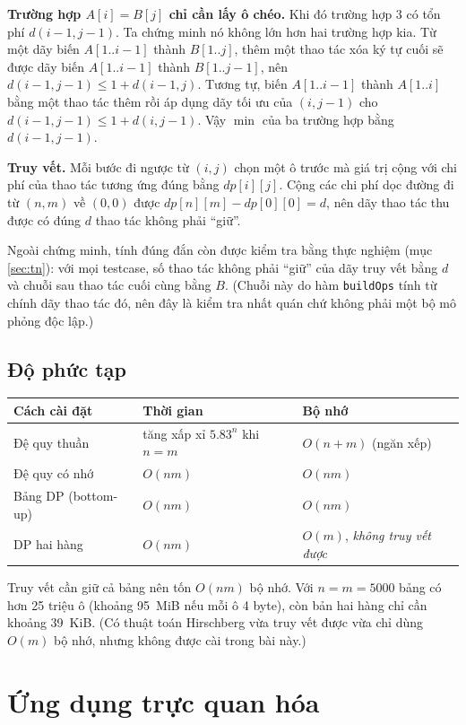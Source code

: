 \documentclass[12pt,a4paper]{article}
\newcommand{\code}[1]{\texttt{#1}}
\begin{document}
\textbf{Trường hợp $A[i]=B[j]$ chỉ cần lấy ô chéo.} Khi đó trường hợp 3 có tổn phí $d(i-1,j-1)$. Ta chứng minh nó không lớn hơn hai trường hợp kia. Từ một dãy biến $A[1..i-1]$ thành $B[1..j]$, thêm một thao tác xóa ký tự cuối sẽ được dãy biến $A[1..i-1]$ thành $B[1..j-1]$, nên $d(i-1,j-1)\le 1+d(i-1,j)$. Tương tự, biến $A[1..i-1]$ thành $A[1..i]$ bằng một thao tác thêm rồi áp dụng dãy tối ưu của $(i,j-1)$ cho $d(i-1,j-1)\le 1+d(i,j-1)$. Vậy $\min$ của ba trường hợp bằng $d(i-1,j-1)$.

\textbf{Truy vết.} Mỗi bước đi ngược từ $(i,j)$ chọn một ô trước mà giá trị cộng với chi phí của thao tác tương ứng đúng bằng $dp[i][j]$. Cộng các chi phí dọc đường đi từ $(n,m)$ về $(0,0)$ được $dp[n][m]-dp[0][0]=d$, nên dãy thao tác thu được có đúng $d$ thao tác không phải ``giữ''.

Ngoài chứng minh, tính đúng đắn còn được kiểm tra bằng thực nghiệm (mục \ref{sec:tn}): với mọi testcase, số thao tác không phải ``giữ'' của dãy truy vết bằng $d$ và chuỗi sau thao tác cuối cùng bằng $B$. (Chuỗi này do hàm \code{buildOps} tính từ chính dãy thao tác đó, nên đây là kiểm tra nhất quán chứ không phải một bộ mô phỏng độc lập.)

\subsection{Độ phức tạp}
\begin{center}
\begin{tabular}{@{}lll@{}}
\toprule
Cách cài đặt & Thời gian & Bộ nhớ\\
\midrule
Đệ quy thuần & tăng xấp xỉ $5.83^n$ khi $n=m$ & $O(n+m)$ (ngăn xếp)\\
Đệ quy có nhớ & $O(nm)$ & $O(nm)$\\
Bảng DP (bottom-up) & $O(nm)$ & $O(nm)$\\
DP hai hàng & $O(nm)$ & $O(m)$, \emph{không truy vết được}\\
\bottomrule
\end{tabular}
\end{center}
Truy vết cần giữ cả bảng nên tốn $O(nm)$ bộ nhớ. Với $n=m=5000$ bảng có hơn 25 triệu ô (khoảng 95~MiB nếu mỗi ô 4 byte), còn bản hai hàng chỉ cần khoảng 39~KiB. (Có thuật toán Hirschberg vừa truy vết được vừa chỉ dùng $O(m)$ bộ nhớ, nhưng không được cài trong bài này.)

\section{Ứng dụng trực quan hóa}
\end{document}
